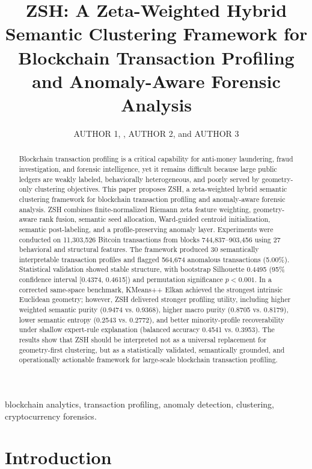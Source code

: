 \documentclass{ieeeaccess}
\title{ZSH: A Zeta-Weighted Hybrid Semantic Clustering Framework for Blockchain Transaction Profiling and Anomaly-Aware Forensic Analysis}
\author{\uppercase{Author 1}, \IEEEmembership{Student Member, IEEE},
\uppercase{Author 2}, and \uppercase{Author 3}}
\begin{document}
\titlepgskip=-15pt
\maketitle

\begin{abstract}
Blockchain transaction profiling is a critical capability for anti-money laundering, fraud investigation, and forensic intelligence, yet it remains difficult because large public ledgers are weakly labeled, behaviorally heterogeneous, and poorly served by geometry-only clustering objectives. This paper proposes ZSH, a zeta-weighted hybrid semantic clustering framework for blockchain transaction profiling and anomaly-aware forensic analysis. ZSH combines finite-normalized Riemann zeta feature weighting, geometry-aware rank fusion, semantic seed allocation, Ward-guided centroid initialization, semantic post-labeling, and a profile-preserving anomaly layer. Experiments were conducted on 11,303,526 Bitcoin transactions from blocks 744,837--903,456 using 27 behavioral and structural features. The framework produced 30 semantically interpretable transaction profiles and flagged 564,674 anomalous transactions (5.00\%). Statistical validation showed stable structure, with bootstrap Silhouette 0.4495 (95\% confidence interval [0.4374, 0.4615]) and permutation significance $p < 0.001$. In a corrected same-space benchmark, KMeans++ Elkan achieved the strongest intrinsic Euclidean geometry; however, ZSH delivered stronger profiling utility, including higher weighted semantic purity (0.9474 vs. 0.9368), higher macro purity (0.8705 vs. 0.8179), lower semantic entropy (0.2543 vs. 0.2772), and better minority-profile recoverability under shallow expert-rule explanation (balanced accuracy 0.4541 vs. 0.3953). The results show that ZSH should be interpreted not as a universal replacement for geometry-first clustering, but as a statistically validated, semantically grounded, and operationally actionable framework for large-scale blockchain transaction profiling.
\end{abstract}

\begin{keywords}
blockchain analytics, transaction profiling, anomaly detection, clustering, cryptocurrency forensics.
\end{keywords}

\section{Introduction}
\end{document}
